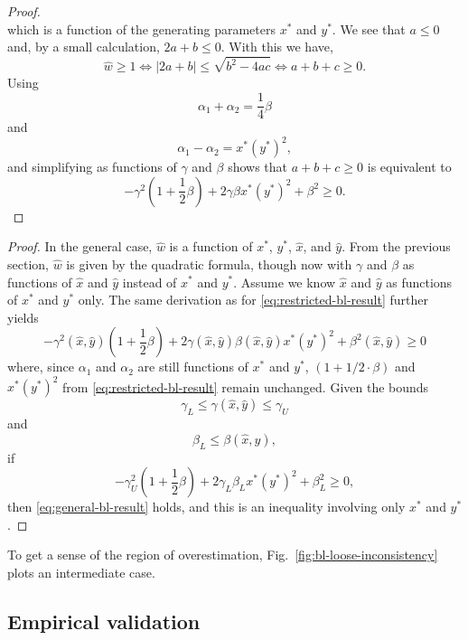 \begin{proof}
$$$$
which is a function of the generating parameters $x^*$ and $y^*$.
We see that $a \le 0$ and, by a small calculation, $2a+b \leq 0$.
With this we have,
$$
\hat{w} \ge 1 \iff
|2a + b| \leq \sqrt{b^2 - 4ac} \iff
a + b + c \ge 0.
$$
Using
$$
\alpha_1 + \alpha_2 = \frac{1}{4}\beta
$$
and
$$
\alpha_1 - \alpha_2 = x^*(y^*)^2,
$$
and simplifying as functions of $\gamma$ and $\beta$ shows that $a + b + c \ge 0$ is equivalent to
\begin{equation}
\label{eq:restricted-bl-result}
-\gamma^2\left(1 + \frac{1}{2}\beta\right) + 2\gamma\beta x^*(y^*)^2 + \beta^2 \ge 0.
\end{equation}
\end{proof}

\generalBranchInconsist*

\begin{proof}
In the general case, $\hat{w}$ is a function of $x^*$, $y^*$, $\hat{x}$, and $\hat{y}$.
From the previous section, $\hat{w}$ is given by the quadratic formula, though now with $\gamma$ and $\beta$ as functions of $\hat{x}$ and $\hat{y}$ instead of $x^*$ and $y^*$.
Assume we know $\hat{x}$ and $\hat{y}$ as functions of $x^*$ and $y^*$ only.
The same derivation as for \eqref{eq:restricted-bl-result} further yields
\begin{equation}
\label{eq:general-bl-result}
-\gamma^2(\hat{x}, \hat{y})\left(1 + \frac{1}{2}\beta\right) + 2\gamma(\hat{x}, \hat{y})\beta(\hat{x}, \hat{y})x^*(y^*)^2 + \beta^2(\hat{x}, \hat{y}) \ge 0
\end{equation}
where, since $\alpha_1$ and $\alpha_2$ are still functions of $x^*$ and $y^*$, $\left(1+1/2\cdot\beta\right)$ and $x^*(y^*)^2$ from \eqref{eq:restricted-bl-result} remain unchanged.
Given the bounds
$$
\gamma_{L} \le \gamma(\hat{x}, \hat{y}) \le \gamma_{U}
$$
and
$$
\beta_{L} \le \beta(\hat{x}, \hat{y}),
$$
if
$$
-\gamma_{U}^2\left(1 + \frac{1}{2}\beta\right) + 2\gamma_{L}\beta_{L}x^*(y^*)^2 + \beta_{L}^2 \ge 0,
$$
then \eqref{eq:general-bl-result} holds, and this is an inequality involving only $x^*$ and $y^*$.
\end{proof}
To get a sense of the region of overestimation, Fig.~\ref{fig:bl-loose-inconsistency} plots an intermediate case.
\subsection*{Empirical validation}

